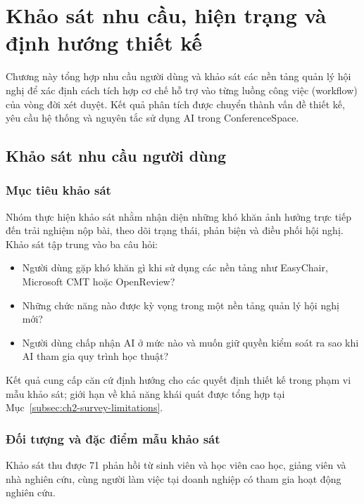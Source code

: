 \chapter{Khảo sát nhu cầu, hiện trạng và định hướng thiết kế}
\label{Chapter2}

Chương này tổng hợp nhu cầu người dùng và khảo sát các nền tảng quản lý hội nghị để xác định cách tích hợp cơ chế hỗ trợ vào từng luồng công việc (workflow) của vòng đời xét duyệt. Kết quả phân tích được chuyển thành vấn đề thiết kế, yêu cầu hệ thống và nguyên tắc sử dụng AI trong ConferenceSpace.

\section{Khảo sát nhu cầu người dùng}
\label{sec:ch2-user-survey}

\subsection{Mục tiêu khảo sát}
\label{subsec:ch2-survey-objectives}

Nhóm thực hiện khảo sát nhằm nhận diện những khó khăn ảnh hưởng trực tiếp đến trải nghiệm nộp bài, theo dõi trạng thái, phản biện và điều phối hội nghị. Khảo sát tập trung vào ba câu hỏi:

\begin{itemize}
    \item Người dùng gặp khó khăn gì khi sử dụng các nền tảng như EasyChair, Microsoft CMT hoặc OpenReview?
    \item Những chức năng nào được kỳ vọng trong một nền tảng quản lý hội nghị mới?
    \item Người dùng chấp nhận AI ở mức nào và muốn giữ quyền kiểm soát ra sao khi AI tham gia quy trình học thuật?
\end{itemize}

Kết quả cung cấp căn cứ định hướng cho các quyết định thiết kế trong phạm vi mẫu khảo sát; giới hạn về khả năng khái quát được tổng hợp tại Mục~\ref{subsec:ch2-survey-limitations}.

\subsection{Đối tượng và đặc điểm mẫu khảo sát}

Khảo sát thu được 71 phản hồi từ sinh viên và học viên cao học, giảng viên và nhà nghiên cứu, cùng người làm việc tại doanh nghiệp có tham gia hoạt động nghiên cứu.

